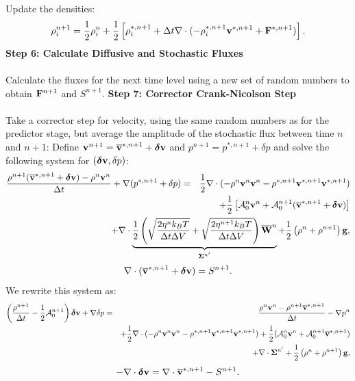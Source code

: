 \documentclass[final]{siamltex}
\def\Fb {{\bf F}}
\def\gb {{\bf g}}
\def\vb {{\bf v}}
\def\Wb {{\bf W}}
\def\deltab {\boldsymbol{\delta}}
\def\Sigmab {\boldsymbol{\Sigma}}
\def\half   {\frac{1}{2}}
\begin{document}
Update the densities:
\begin{equation}
\rho_i^{n+1} = \half\rho_i^n + \half\left[\rho_i^{*,n+1} + \Delta t\nabla\cdot(-\rho_i^{*,n+1}\vb^{*,n+1} + \Fb^{*,n+1})\right].
\end{equation}
{\bf Step 6: Calculate Diffusive and Stochastic Fluxes}\\ \\
Calculate the fluxes for the next time level using a new set of random numbers to obtain $\Fb^{n+1}$ and $S^{n+1}$.
{\bf Step 7: Corrector Crank-Nicolson Step}\\ \\
Take a corrector step for velocity, using the same random numbers as for the predictor
stage, but average the amplitude of the stochastic flux between time $n$ and $n+1$:
Define $\vb^{n+1} = \overline\vb^{*,n+1} + \deltab\vb$ and $p^{n+1} = p^{*,n+1} + \delta p$ and
solve the following system for $(\deltab\vb,\delta p)$:
\begin{eqnarray}
\frac{\rho^{n+1}(\overline\vb^{*,n+1} + \deltab\vb) - \rho^n\vb^n}{\Delta t} + \nabla(p^{*,n+1}+\delta p) &=& \half\nabla\cdot(-\rho^n\vb^n\vb^n - \rho^{*,n+1}\vb^{*,n+1}\vb^{*,n+1})\nonumber\\
&&\hspace{-1.5in}+ \half\left[\mathcal{A}_0^n\vb^n + \mathcal{A}_0^{n+1}(\overline\vb^{*,n+1} + \deltab\vb)\right]\nonumber\\
&&\hspace{-1.5in}+ \nabla\cdot\underbrace{\half\left(\sqrt{\frac{2\eta^n k_B T}{\Delta t\Delta V}} + \sqrt{\frac{2\eta^{n+1} k_B T}{\Delta t\Delta V}}\right)\overline\Wb^n}_{\Sigmab^{n'}} + \half\left(\rho^n+\rho^{n+1}\right)\gb,
\end{eqnarray}
\begin{equation}
\nabla\cdot(\overline\vb^{*,n+1} + \deltab\vb) = S^{n+1}.
\end{equation}
We rewrite this system as:
\begin{eqnarray}
\left(\frac{\rho^{n+1}}{\Delta t} - \half\mathcal{A}_0^{n+1}\right)\deltab\vb + \nabla\delta p &=& \frac{\rho^n\vb^n-\rho^{n+1}\overline\vb^{*,n+1}}{\Delta t} -\nabla p^n\nonumber\\
&&+ \half\nabla\cdot(-\rho^n\vb^n\vb^n - \rho^{*,n+1}\vb^{*,n+1}\vb^{*,n+1}) + \half(\mathcal{A}_0^n\vb^n + \mathcal{A}_0^{n+1}\overline\vb^{*,n+1} )\nonumber\\
&&+ \nabla\cdot\Sigmab^{n'} + \half\left(\rho^n+\rho^{n+1}\right)\gb,
\end{eqnarray}
\begin{equation}
-\nabla\cdot\deltab\vb = \nabla\cdot\overline\vb^{*,n+1} - S^{n+1}.
\end{equation}
\end{document}
